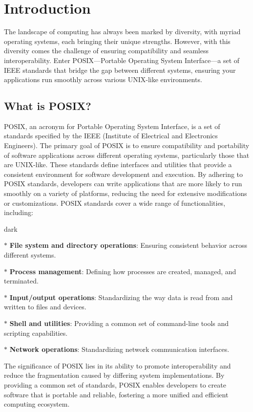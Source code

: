 \section{Introduction}
The landscape of computing has always been marked by diversity, with myriad operating systems, each bringing their unique strengths. However, with this diversity comes the challenge of ensuring compatibility and seamless interoperability.
Enter POSIX—Portable Operating System Interface—a set of IEEE standards that bridge the gap between different systems, ensuring your applications run smoothly across various UNIX-like environments.

\subsection{What is POSIX?}
POSIX, an acronym for Portable Operating System Interface, is a set of standards specified by the IEEE (Institute of Electrical and Electronics Engineers). The primary goal of POSIX is to ensure compatibility and portability of software applications across different operating systems, particularly those that are UNIX-like.
These standards define interfaces and utilities that provide a consistent environment for software development and execution. By adhering to POSIX standards, developers can write applications that are more likely to run smoothly on a variety of platforms, reducing the need for extensive modifications or customizations.
POSIX standards cover a wide range of functionalities, including: 
\bigskip
\begin{baseBoxOne}{}{dark}
    \begin{posnexItemize} 
        \item[$\ast$] \textbf{File system and directory operations}: Ensuring consistent behavior across different systems. 
        \item[$\ast$] \textbf{Process management}: Defining how processes are created, managed, and terminated. 
        \item[$\ast$] \textbf{Input/output operations}: Standardizing the way data is read from and written to files and devices. 
        \item[$\ast$] \textbf{Shell and utilities}: Providing a common set of command-line tools and scripting capabilities. 
        \item[$\ast$] \textbf{Network operations}: Standardizing network communication interfaces.
    \end{posnexItemize}
\end{baseBoxOne}
\bigskip
The significance of POSIX lies in its ability to promote interoperability and reduce the fragmentation caused by differing system implementations.
By providing a common set of standards, POSIX enables developers to create software that is portable and reliable, fostering a more unified and efficient computing ecosystem.

